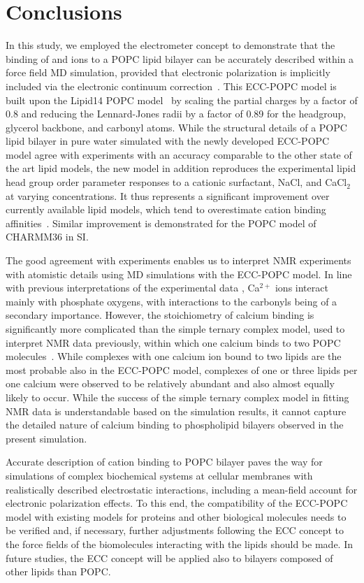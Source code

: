 \documentclass[journal=jpcbfk,manuscript=article]{achemso}
\begin{document}
\section{Conclusions}

In this study, we employed the electrometer concept to demonstrate that the binding of  and  ions to a POPC lipid bilayer can be accurately described within a force field MD simulation, provided that electronic polarization is implicitly included via the electronic continuum correction~\cite{leontyev11}. This ECC-POPC model is built upon the Lipid14 POPC model~\cite{dickson14} by scaling the partial charges by a factor of 0.8 and reducing the Lennard-Jones radii by a factor of 0.89 for the headgroup, glycerol backbone, and carbonyl atoms. While the structural details of a POPC lipid bilayer in pure water simulated with the newly developed ECC-POPC model agree with experiments with an accuracy comparable to the other state of the art lipid models, the new model in addition reproduces the experimental lipid head group order parameter responses to a cationic surfactant, NaCl, and CaCl$_2$ at varying concentrations. It thus represents a significant improvement over currently available lipid models, which tend to overestimate cation binding affinities~\cite{catte16}.
Similar improvement is demonstrated for the POPC model of CHARMM36 \cite{klauda10} in SI.

The good agreement with experiments enables us to interpret NMR experiments with atomistic details using MD simulations with the ECC-POPC model. In line with previous interpretations of the experimental data \cite{hauser76,hauser78,herbette84,binder02}, Ca$^{2+}$ ions interact mainly with phosphate oxygens, with interactions to the carbonyls being of a secondary importance. However, the stoichiometry of calcium binding is significantly more complicated than the simple ternary complex model, used to interpret NMR data previously, within which one calcium binds to two POPC molecules~\cite{altenbach84}. While complexes with one calcium ion bound to two lipids are the most probable also in the ECC-POPC model, complexes of one or three lipids per one calcium were observed to be relatively abundant and also almost equally likely to occur. While the success of the simple ternary complex model in fitting NMR data is understandable based on the simulation results, it cannot capture the detailed nature of calcium binding to phospholipid bilayers observed in the present simulation.

Accurate description of cation binding to POPC bilayer paves the way for simulations of complex biochemical systems at cellular membranes with realistically described electrostatic interactions, including a mean-field account for electronic polarization effects. To this end, the compatibility of the ECC-POPC model with existing models for proteins and other biological molecules needs to be verified and, if necessary, further adjustments following the ECC concept to the force fields of the biomolecules interacting with the lipids should be made.
In future studies, the ECC concept will be applied also to bilayers composed of other lipids than POPC.
\end{document}
